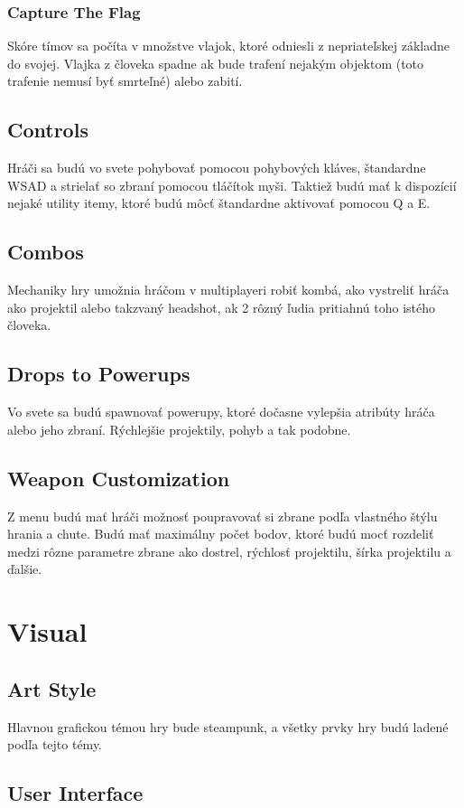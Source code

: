 \documentclass[a4paper]{report}
\begin{document}
\subsection{Capture The Flag}
Skóre tímov sa počíta v množstve vlajok, ktoré odniesli z nepriateľskej základne do svojej. Vlajka z človeka spadne ak bude trafení nejakým objektom (toto trafenie nemusí byť smrteľné) alebo zabití.
 
\section{Controls}
Hráči sa budú vo svete pohybovať pomocou pohybových kláves, štandardne WSAD a strielať so zbraní pomocou tláčítok myši. Taktiež budú mať k dispozícií nejaké utility itemy, ktoré budú môcť štandardne aktivovať pomocou Q a E.

\section{Combos}
Mechaniky hry umožnia hráčom v multiplayeri robiť kombá, ako vystreliť hráča ako projektil alebo takzvaný headshot, ak 2 rôzný ľudia pritiahnú toho istého človeka.

\section{Drops to Powerups}
Vo svete sa budú spawnovať powerupy, ktoré dočasne vylepšia atribúty hráča alebo jeho zbraní. Rýchlejšie projektily, pohyb a tak podobne.

\section{Weapon Customization}
Z menu budú mať hráči možnosť poupravovať si zbrane podľa vlastného štýlu hrania a chute. Budú mať maximálny počet bodov, ktoré budú mocť rozdeliť medzi rôzne parametre zbrane ako dostrel, rýchlosť projektilu, šírka projektilu a ďalšie.
 
\chapter{Visual}
\section{Art Style}
Hlavnou grafickou témou hry bude steampunk, a všetky prvky hry budú ladené podľa tejto témy.
 
\section{User Interface}
\end{document}
